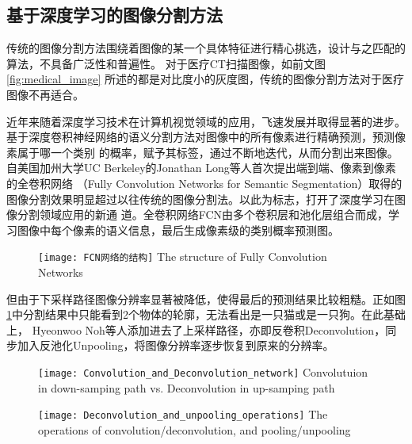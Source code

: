 	\subsection{基于深度学习的图像分割方法}
	
	传统的图像分割方法围绕着图像的某一个具体特征进行精心挑选，设计与之匹配的算法，不具备广泛性和普遍性。 对于医疗CT扫描图像，如前文图\ref{fig:medical_image}
	所述的都是对比度小的灰度图，传统的图像分割方法对于医疗图像不再适合。
	
	近年来随着深度学习技术在计算机视觉领域的应用，飞速发展并取得显著的进步。 基于深度卷积神经网络的语义分割方法对图像中的所有像素进行精确预测，预测像素属于哪一个类别
	的概率，赋予其标签，通过不断地迭代，从而分割出来图像。自美国加州大学UC Berkeley的Jonathan Long等人\cite{long2015fully}首次提出端到端、像素到像素的全卷积网络
	（Fully Convolution Networks for Semantic Segmentation）取得的图像分割效果明显超过以往传统的图像分割法。以此为标志，打开了深度学习在图像分割领域应用的新通
	道。全卷积网络FCN由多个卷积层和池化层组合而成，学习图像中每个像素的语义信息，最后生成像素级的类别概率预测图。
	\begin{figure}[!htp]
		\centering
		\texttt{[image: FCN网络的结构]}
			{The structure of Fully Convolution Networks}
		\label{fig:FCN}
	\end{figure}
	
	但由于下采样路径图像分辨率显著被降低，使得最后的预测结果比较粗糙。正如图\ref{fig:FCN}中分割结果中只能看到2个物体的轮廓，无法看出是一只猫或是一只狗。在此基础上，
	Hyeonwoo Noh等人\cite{Noh2015LearningDN}添加进去了上采样路径，亦即反卷积Deconvolution，同步加入反池化Unpooling，将图像分辨率逐步恢复到原来的分辨率。
	\begin{figure}[!htp]
		\centering
		\texttt{[image: Convolution\_and\_Deconvolution\_network]}
			{Convolutuion in down-samping path vs. Deconvolution in up-samping path}
		\label{fig:conv_deconv}
	\end{figure}
	\begin{figure}[!htp]
		\centering
		\texttt{[image: Deconvolution\_and\_unpooling\_operations]}
			{The operations of convolution/deconvolution, and pooling/unpooling}
		\label{fig:conv_deconv_pooling_unpooling}
	\end{figure}
	
